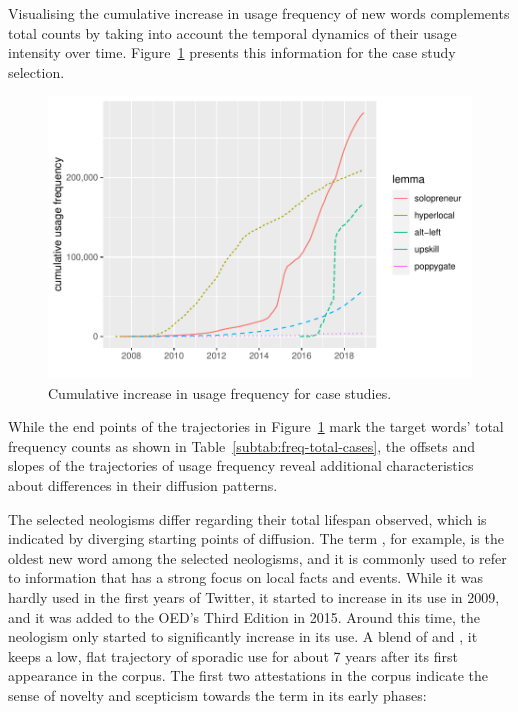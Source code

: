 \documentclass[
  a4paper,
  abstract=on,
  captions=tableabove
  ]{scrartcl}
\begin{document}
      Visualising the cumulative increase in usage frequency of new words complements total counts by taking into account the temporal dynamics of their usage intensity over time. Figure~\ref{fig:freq_cum_cases} presents this information for the case study selection.

      \begin{figure}
        \caption[Cumulative increase in usage frequency]{Cumulative increase in usage frequency for case studies.\protect\footnotemark}
        \label{fig:freq_cum_cases}
        \centering
        \includegraphics[width=.8\linewidth]{img/freq_cum_cases.pdf}
      \end{figure}

      While the end points of the trajectories in Figure~\ref{fig:freq_cum_cases} mark the target words' total frequency counts as shown in Table~\ref{subtab:freq-total-cases}, the offsets and slopes of the trajectories of usage frequency reveal additional characteristics about differences in their diffusion patterns.

      The selected neologisms differ regarding their total lifespan observed, which is indicated by diverging starting points of diffusion. The term , for example, is the oldest new word among the selected neologisms, and it is commonly used to refer to information that has a strong focus on local facts and events. While it was hardly used in the first years of Twitter, it started to increase in its use in 2009, and it was added to the OED's Third Edition in 2015. Around this time, the neologism  only started to significantly increase in its use. A blend of  and , it keeps a low, flat trajectory of sporadic use for about 7 years after its first appearance in the corpus. The first two attestations in the corpus indicate the sense of novelty and scepticism towards the term in its early phases:
\end{document}
